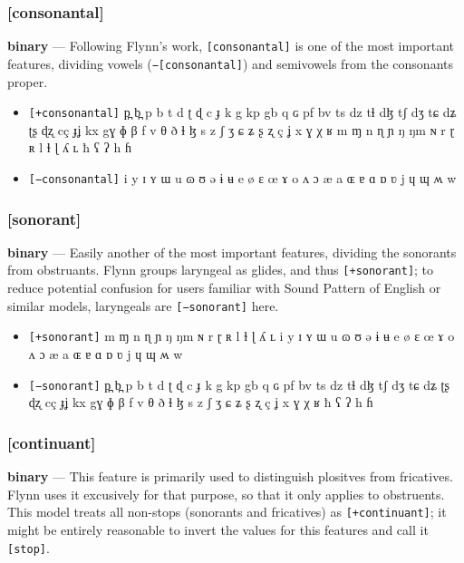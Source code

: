 \documentclass[10pt,letterpaper]{article}
\begin{document}
\subsubsection{[consonantal]}
\label{ssub:feature_consonantal}
\textbf{binary} — Following Flynn's work, \texttt{[consonantal]} is one of the most important features, dividing vowels (\texttt{−[consonantal]}) and semivowels from the consonants proper.

\begin{itemize}
\item \texttt{[+consonantal]} p̪ b̪ p b t d ʈ ɖ c ɟ k g kp gb q ɢ pf bv ts dz tɬ dɮ tʃ dʒ tɕ dʑ ʈʂ ɖʐ cç ɟʝ kx gɣ ɸ β f v θ ð ɬ ɮ s z ʃ ʒ ɕ ʑ ʂ ʐ ç ʝ x ɣ χ ʁ m ɱ n ɳ ɲ ŋ ŋm ɴ r ɽ ʀ l ɫ ɭ ʎ ʟ ħ ʕ ʔ h ɦ 
\item \texttt{[−consonantal]} i y ɪ ʏ ɯ u ɷ ʊ ə ɨ ʉ e ø ɛ œ ɤ o ʌ ɔ æ a ɶ ɐ ɑ ɒ ʋ j ɥ ɰ ʍ w 
\end{itemize}

\subsubsection{[sonorant]}
\label{ssub:feature_sonorant}
\textbf{binary} — Easily another of the most important features, dividing the sonorants from obstruants. Flynn groups laryngeal as glides, and thus \texttt{[+sonorant]}; to reduce potential confusion for users familiar with Sound Pattern of English or similar models, laryngeals are \texttt{[−sonorant]} here.

\begin{itemize}
\item \texttt{[+sonorant]} m ɱ n ɳ ɲ ŋ ŋm ɴ r ɽ ʀ l ɫ ɭ ʎ ʟ i y ɪ ʏ ɯ u ɷ ʊ ə ɨ ʉ e ø ɛ œ ɤ o ʌ ɔ æ a ɶ ɐ ɑ ɒ ʋ j ɥ ɰ ʍ w 
\item \texttt{[−sonorant]} p̪ b̪ p b t d ʈ ɖ c ɟ k g kp gb q ɢ pf bv ts dz tɬ dɮ tʃ dʒ tɕ dʑ ʈʂ ɖʐ cç ɟʝ kx gɣ ɸ β f v θ ð ɬ ɮ s z ʃ ʒ ɕ ʑ ʂ ʐ ç ʝ x ɣ χ ʁ ħ ʕ ʔ h ɦ 
\end{itemize}

\subsubsection{[continuant]}
\label{ssub:feature_continuant}
\textbf{binary} — This feature is primarily used to distinguish plositves from fricatives. Flynn uses it excusively for that purpose, so that it only applies to obstruents. This model treats all non-stops (sonorants and fricatives) as \texttt{[+continuant]}; it might be entirely reasonable to invert the values for this features and call it \texttt{[stop]}.
\end{document}
